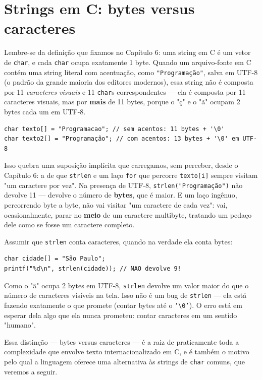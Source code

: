 \documentclass[12pt,a4paper,oneside]{extreport}
\begin{document}
\section*{Strings em C: bytes versus caracteres}

Lembre-se da definição que fixamos no Capítulo 6: uma string em C é um vetor de \texttt{char}, e cada \texttt{char} ocupa exatamente 1 byte. Quando um arquivo-fonte em C contém uma string literal com acentuação, como \texttt{"Programação"}, salva em UTF-8 (o padrão da grande maioria dos editores modernos), essa string não é composta por 11 \textit{caracteres visuais} e 11 \texttt{char}s correspondentes — ela é composta por 11 caracteres visuais, mas por \textbf{mais} de 11 bytes, porque o "ç" e o "ã" ocupam 2 bytes cada um em UTF-8.

\begin{lstlisting}
char texto[] = "Programacao"; // sem acentos: 11 bytes + '\0'
char texto2[] = "Programação"; // com acentos: 13 bytes + '\0' em UTF-8
\end{lstlisting}

Isso quebra uma suposição implícita que carregamos, sem perceber, desde o Capítulo 6: a de que \texttt{strlen} e um laço \texttt{for} que percorre \texttt{texto[i]} sempre visitam "um caractere por vez". Na presença de UTF-8, \texttt{strlen("Programação")} não devolve 11 — devolve o número de \textbf{bytes}, que é maior. E um laço ingênuo, percorrendo byte a byte, não vai visitar "um caractere de cada vez": vai, ocasionalmente, parar no \textbf{meio} de um caractere multibyte, tratando um pedaço dele como se fosse um caractere completo.

\begin{errocomum}
Assumir que \texttt{strlen} conta caracteres, quando na verdade ela conta bytes:
\begin{lstlisting}
char cidade[] = "São Paulo";
printf("%d\n", strlen(cidade)); // NAO devolve 9!
\end{lstlisting}
Como o "ã" ocupa 2 bytes em UTF-8, \texttt{strlen} devolve um valor maior do que o número de caracteres visíveis na tela. Isso não é um bug de \texttt{strlen} — ela está fazendo exatamente o que promete (contar bytes até o \texttt{'\textbackslash 0'}). O erro está em esperar dela algo que ela nunca prometeu: contar caracteres em um sentido "humano".
\end{errocomum}

Essa distinção — bytes versus caracteres — é a raiz de praticamente toda a complexidade que envolve texto internacionalizado em C, e é também o motivo pelo qual a linguagem oferece uma alternativa às strings de \texttt{char} comuns, que veremos a seguir.
\end{document}
